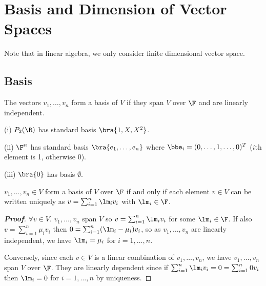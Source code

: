 
\section{Basis and Dimension of Vector Spaces}

Note that in linear algebra, we only consider finite dimensional vector space.

\subsection{Basis}

\begin{definition}\label{def:basis_vector_space}
The vectors $v_1, \dots, v_n$ form a basis of $V$ if they span $V$ over $\F$ and are linearly independent.
\end{definition}

\begin{example}
\ben
\item [(i)] $P_2(\R)$ has standard basis $\bra{1, X, X^2}$.
\item [(ii)] $\F^n$ has standard basis $\bra{e_1, \dots, e_n}$ where $\bbe_i = (0, \dots, 1, \dots, 0)^T$ ($i$th element is 1, otherwise 0).
\item [(iii)] $\bra{0}$ has basis $\emptyset$.
\een
\end{example}

\begin{lemma}
$v_1, \dots, v_n \in V$ form a basis of $V$ over $\F$ if and only if each element $v \in V$ can be written uniquely as $v = \sum^n_{i=1} \lm_iv_i$ with $\lm_i \in \F$.
\end{lemma}

\begin{proof}[\bf Proof]
$\forall v \in V$. $v_1, \dots, v_n$ span $V$ so $v = \sum^n_{i=1} \lm_iv_i$ for some $\lm_i \in \F$. If also $v = \sum^n_{i=1} \mu_iv_i$ then $0 = \sum^n_{i=1}(\lm_i - \mu_i)v_i$, so as $v_1, \dots, v_n$ are linearly independent, we have $\lm_i = \mu_i$ for $i = 1, \dots, n$.

Conversely, since each $v \in V$ is a linear combination of $v_1, \dots, v_n$, we have $v_1, \dots, v_n$ span $V$ over $\F$. They are linearly dependent since if $\sum^n_{i=1} \lm_iv_i = 0 = \sum^n_{i=1} 0v_i$ then $\lm_i = 0$ for $i = 1, \dots, n$ by uniqueness.
\end{proof}


